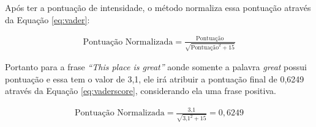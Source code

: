 Após ter a pontuação de intensidade, o método normaliza essa pontuação através
da Equação \ref{eq:vader}:

\begin{equation}
\begin{gathered}
\text{Pontuação Normalizada}
=
\frac{\text{Pontuação}}{\sqrt{\text{Pontuação}^2 + 15}}
\label{eq:vader}
\end{gathered}
\end{equation}

Portanto para a frase \textit{``This place is great''} aonde somente a palavra
\textit{great} possui pontuação e essa tem o valor de 3,1, ele irá atribuir a
pontuação final de 0,6249 através da Equação \ref{eq:vaderscore}, considerando
ela uma frase positiva.

\begin{equation}
\begin{gathered}
\text{Pontuação Normalizada}
=
\frac{\text{3,1}}{\sqrt{\text{3,1}^2 + 15}} = 0,6249
\label{eq:vaderscore}
\end{gathered}
\end{equation}